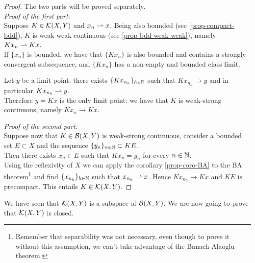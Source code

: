 \begin{proof} The two parts will be proved separately.\\
	\textit{Proof of the first part:}\\ 
	Suppose $K \in \mathcal K(X,Y)$ and $x_n \rightharpoonup x$. Being also bounded (see \vref{prop-compact-bdd}), $K$ is weak-weak continuous (see \vref{prop-bdd-weak-weak}), namely $Kx_n \rightharpoonup Kx$.\\
	If $\{x_n\}$ is bounded, we have that $\{Kx_n\}$ is also bounded and contains a strongly convergent subsequence, and $\{Kx_n\}$ has a non-empty and bounded class limit.
	
	Let $y$ be a limit point: there exists $\{K x_{n_h}\}_{h \in \mathbb N}$ such that $Kx_{n_h} \to y$ and in particular $Kx_{n_h} \rightharpoonup y$.\\
	Therefore $y = Kx$ is the only limit point: we have that $K$ is weak-strong continuous, namely $Kx_n \to Kx$.
	
	\textit{Proof of the second part:}\\ 
	Suppose now that $K \in \mathcal B(X,Y)$ is weak-strong continuous, consider a bounded set $E \subset X$  and the sequence $\{y_n\}_{n\in\mathbb N} \subset KE$.\\
	Then there exists $x_n \in E$ such that $Kx_n = y_n$ for every $n \in \mathbb N$.\\
	
	Using the reflexivity of $X$ we can apply the corollary \vref{prop-coro-BA} to the BA theorem\footnote{Remember that separability was not necessary, even though to prove it without this assumption, we can't take advantage of the Banach-Alaoglu theorem.} and find $\{x_{n_h}\}_{h \in \mathbb N}$ such that $x_{n_h}\rightharpoonup x$. Hence $Kx_{n_h} \to Kx$ and $KE$ is precompact. This entails $K \in \mathcal K(X,Y)$.
\end{proof}

We have seen that $\mathcal K(X,Y)$ is a subspace of $\mathcal B(X,Y)$. We are now going to prove that $\mathcal K(X,Y)$ is closed.


